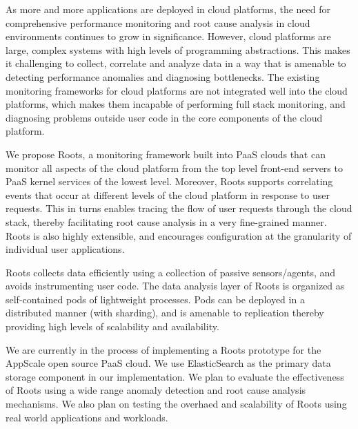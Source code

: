 As more and more applications are deployed in cloud platforms, the need
for comprehensive performance monitoring and root cause analysis 
in cloud environments continues to grow in significance. However,
cloud platforms are large, complex systems with high levels of
programming abstractions. This makes it challenging to collect,
correlate and analyze data in a way that is amenable to detecting
performance anomalies and diagnosing bottlenecks. The existing
monitoring frameworks for cloud platforms are not integrated
well into the cloud platforms, which makes them incapable of
performing full stack monitoring, and diagnosing problems
outside user code in the core components of the cloud platform.

We propose Roots, a monitoring framework built into PaaS clouds
that can monitor all aspects of the cloud platform from the top
level front-end servers to PaaS kernel services of the lowest level.
Moreover, Roots supports correlating events that occur at different
levels of the cloud platform in response to user requests. This
in turns enables tracing the flow of user requests through the
cloud stack, thereby facilitating root cause analysis in a very
fine-grained manner. Roots is also highly extensible, and
encourages configuration at the granularity of individual
user applications. 

Roots collects data efficiently using a 
collection of passive sensors/agents, and avoids instrumenting
user code. The data analysis layer of Roots is organized as 
self-contained pods of lightweight processes. Pods can be
deployed in a distributed manner (with sharding), and is
amenable to replication thereby providing high levels of
scalability and availability. 

We are currently in the process of implementing a Roots
prototype for the AppScale open source PaaS cloud. We
use ElasticSearch as the primary data storage component in
our implementation. We plan to evaluate the effectiveness
of Roots using a wide range anomaly detection and root
cause analysis mechanisms. We also plan on testing the
overhaed and scalability of Roots using real world applications
and workloads.
